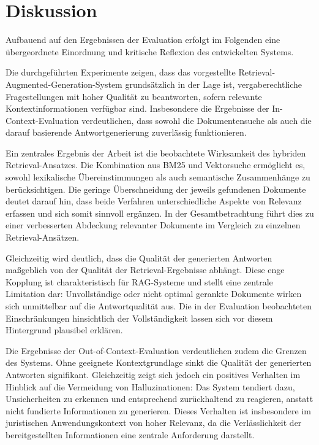 \section{Diskussion}
\label{sec:Diskussion}

Aufbauend auf den Ergebnissen der Evaluation erfolgt im Folgenden eine übergeordnete Einordnung und kritische Reflexion des entwickelten Systems.

Die durchgeführten Experimente zeigen, dass das vorgestellte Retrieval-Augmented-Generation-System grundsätzlich in der Lage ist, vergaberechtliche Fragestellungen mit hoher Qualität zu beantworten, sofern relevante Kontextinformationen verfügbar sind. Insbesondere die Ergebnisse der In-Context-Evaluation verdeutlichen, dass sowohl die Dokumentensuche als auch die darauf basierende Antwortgenerierung zuverlässig funktionieren.

Ein zentrales Ergebnis der Arbeit ist die beobachtete Wirksamkeit des hybriden Retrieval-Ansatzes. Die Kombination aus BM25 und Vektorsuche ermöglicht es, sowohl lexikalische Übereinstimmungen als auch semantische Zusammenhänge zu berücksichtigen. Die geringe Überschneidung der jeweils gefundenen Dokumente deutet darauf hin, dass beide Verfahren unterschiedliche Aspekte von Relevanz erfassen und sich somit sinnvoll ergänzen. In der Gesamtbetrachtung führt dies zu einer verbesserten Abdeckung relevanter Dokumente im Vergleich zu einzelnen Retrieval-Ansätzen.

Gleichzeitig wird deutlich, dass die Qualität der generierten Antworten maßgeblich von der Qualität der Retrieval-Ergebnisse abhängt. Diese enge Kopplung ist charakteristisch für RAG-Systeme und stellt eine zentrale Limitation dar: Unvollständige oder nicht optimal gerankte Dokumente wirken sich unmittelbar auf die Antwortqualität aus. Die in der Evaluation beobachteten Einschränkungen hinsichtlich der Vollständigkeit lassen sich vor diesem Hintergrund plausibel erklären.

Die Ergebnisse der Out-of-Context-Evaluation verdeutlichen zudem die Grenzen des Systems. Ohne geeignete Kontextgrundlage sinkt die Qualität der generierten Antworten signifikant. Gleichzeitig zeigt sich jedoch ein positives Verhalten im Hinblick auf die Vermeidung von Halluzinationen: Das System tendiert dazu, Unsicherheiten zu erkennen und entsprechend zurückhaltend zu reagieren, anstatt nicht fundierte Informationen zu generieren. Dieses Verhalten ist insbesondere im juristischen Anwendungskontext von hoher Relevanz, da die Verlässlichkeit der bereitgestellten Informationen eine zentrale Anforderung darstellt.

